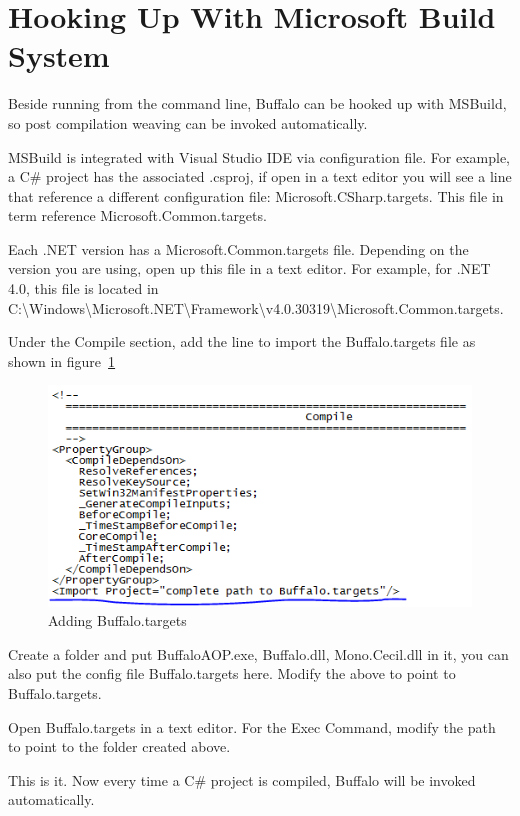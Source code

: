 \section{Hooking Up With Microsoft Build System}

Beside running from the command line, Buffalo can be hooked up with MSBuild, so post compilation weaving can be invoked automatically.

MSBuild is integrated with Visual Studio IDE via configuration file. For example, a C\# project has the associated .csproj, if open in a text editor you will see a line that reference a different configuration file: Microsoft.CSharp.targets. This file in term reference Microsoft.Common.targets.

Each .NET version has a Microsoft.Common.targets file. Depending on the version you are using, open up this file in a text editor. For example, for .NET 4.0, this file is located in C:\textbackslash Windows\textbackslash Microsoft.NET\textbackslash Framework\textbackslash v4.0.30319\textbackslash Microsoft.Common.targets.

Under the Compile section, add the line to import the Buffalo.targets file as shown in figure~\ref{buffalo_targets}

\begin{figure}[H]
  \includegraphics[scale=1.0]{CommonTarget.PNG}
  \centering
  \caption{Adding Buffalo.targets\label{buffalo_targets}}
\end{figure}

Create a folder and put BuffaloAOP.exe, Buffalo.dll, Mono.Cecil.dll in it, you can also put the config file Buffalo.targets here. Modify the above to point to Buffalo.targets.

Open Buffalo.targets in a text editor. For the Exec Command, modify the path to point to the folder created above.

This is it. Now every time a C\# project is compiled, Buffalo will be invoked automatically.
